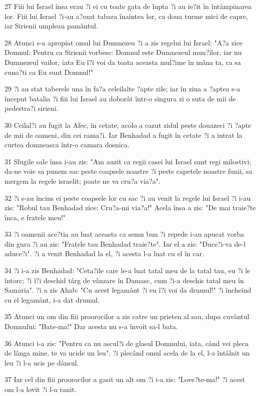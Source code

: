 \par 27 Fiii lui Israel însa erau ?i ei cu toate gata de lupta ?i au ie?it în întâmpinarea lor. Fiii lui Israel ?i-au a?ezat tabara înaintea lor, ca doua turme mici de capre, iar Sirienii umpleau pamântul.
\par 28 Atunci s-a apropiat omul lui Dumnezeu ?i a zis regelui lui Israel: "A?a zice Domnul: Pentru ca Sirienii vorbesc: Domnul este Dumnezeul mun?ilor, iar nu Dumnezeul vailor, iata Eu î?i voi da toata aceasta mul?ime în mâna ta, ca sa cuno?ti ca Eu sunt Domnul!"
\par 29 ?i au stat taberele una în fa?a celeilalte ?apte zile; iar în ziua a ?aptea s-a început batalia ?i fiii lui Israel au doborât într-o singura zi o suta de mii de pedestra?i sirieni.
\par 30 Ceilal?i au fugit la Afec, în cetate; acolo a cazut zidul peste douazeci ?i ?apte de mii de oameni, din cei rama?i. Iar Benhadad a fugit în cetate ?i a intrat la curtea domneasca într-o camara dosnica.
\par 31 Slugile sale însa i-au zis: "Am auzit ca regii casei lui Israel sunt regi milostivi; da-ne voie sa punem sac peste coapsele noastre ?i peste capetele noastre funii, sa mergem la regele israelit; poate ne va cru?a via?a".
\par 32 ?i s-au încins ei peste coapsele lor cu sac ?i au venit la regele lui Israel ?i i-au zis: "Robul tau Benhadad zice: Cru?a-mi via?a!" Acela însa a zis: "De mai traie?te înca, e fratele meu!"
\par 33 ?i oamenii ace?tia au luat aceasta ca semn bun ?i repede i-au apucat vorba din gura ?i au zis: "Fratele tau Benhadad traie?te". Iar el a zis: "Duce?i-va de-l aduce?i". ?i a venit Benhadad la el, ?i acesta l-a luat cu el în car.
\par 34 ?i i-a zis Benhadad: "Ceta?ile care le-a luat tatal meu de la tatal tau, eu ?i le întorc; ?i î?i deschid târg de vânzare în Damasc, cum ?i-a deschis tatal meu în Samaria". ?i a zis Ahab: "Cu acest legamânt ?i eu î?i voi da drumul!" ?i încheind cu el legamânt, i-a dat drumul.
\par 35 Atunci un om din fiii proorocilor a zis catre un prieten al sau, dupa cuvântul Domnului: "Bate-ma!" Dar acesta nu s-a învoit sa-l bata.
\par 36 Atunci i-a zis: "Pentru ca nu ascul?i de glasul Domnului, iata, când vei pleca de lânga mine, te va ucide un leu". ?i plecând omul acela de la el, l-a întâlnit un leu ?i l-a ucis pe dânsul.
\par 37 Iar cel din fiii proorocilor a gasit un alt om ?i i-a zis: "Love?te-ma!" ?i acest om l-a lovit ?i l-a ranit.
